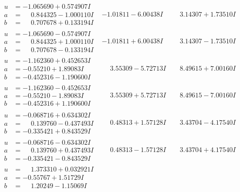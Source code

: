 \documentclass[1p]{elsarticle_modified}
\theoremstyle{definition}
\begin{document}
$$\begin{array}{c|c|c}
\begin{aligned}
u &= -1.065690 + 0.574907 I \\
a &= \phantom{-}0.844325 - 1.000110 I \\
b &= \phantom{-}0.707678 + 0.133194 I\end{aligned}
 & -1.01811 - 6.00438 I & \phantom{-}3.14307 + 1.73510 I \\ \hline\begin{aligned}
u &= -1.065690 - 0.574907 I \\
a &= \phantom{-}0.844325 + 1.000110 I \\
b &= \phantom{-}0.707678 - 0.133194 I\end{aligned}
 & -1.01811 + 6.00438 I & \phantom{-}3.14307 - 1.73510 I \\ \hline\begin{aligned}
u &= -1.162360 + 0.452653 I \\
a &= -0.55210 + 1.89083 I \\
b &= -0.452316 - 1.190600 I\end{aligned}
 & \phantom{-}3.55309 - 5.72713 I & \phantom{-}8.49615 + 7.00160 I \\ \hline\begin{aligned}
u &= -1.162360 - 0.452653 I \\
a &= -0.55210 - 1.89083 I \\
b &= -0.452316 + 1.190600 I\end{aligned}
 & \phantom{-}3.55309 + 5.72713 I & \phantom{-}8.49615 - 7.00160 I \\ \hline\begin{aligned}
u &= -0.068716 + 0.634302 I \\
a &= \phantom{-}0.139760 - 0.437493 I \\
b &= -0.335421 + 0.843529 I\end{aligned}
 & \phantom{-}0.48313 + 1.57128 I & \phantom{-}3.43704 - 4.17540 I \\ \hline\begin{aligned}
u &= -0.068716 - 0.634302 I \\
a &= \phantom{-}0.139760 + 0.437493 I \\
b &= -0.335421 - 0.843529 I\end{aligned}
 & \phantom{-}0.48313 - 1.57128 I & \phantom{-}3.43704 + 4.17540 I \\ \hline\begin{aligned}
u &= \phantom{-}1.373310 + 0.032921 I \\
a &= -0.55767 + 1.51729 I \\
b &= \phantom{-}1.20249 - 1.15069 I\end{aligned}

\end{array}$$
\end{document}
